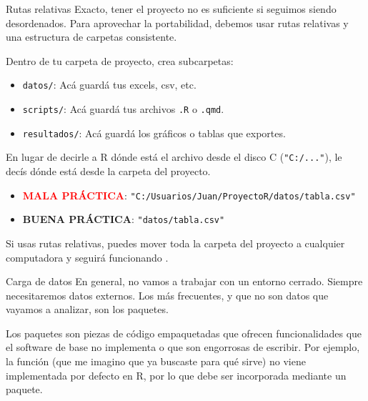 \documentclass[8pt]{beamer}
\begin{document}
	
	\begin{frame}[fragile]{Rutas relativas}
		Exacto, tener el proyecto no es suficiente si seguimos siendo desordenados. Para aprovechar la portabilidad, debemos usar rutas relativas y una estructura de carpetas consistente.
		
		Dentro de tu carpeta de proyecto, crea subcarpetas:
		\begin{itemize}
			\item \verb`datos/`: Ac\'a guard\'a tus excels, csv, etc. 
			\item \verb`scripts/`: Ac\'a guard\'a tus archivos \verb`.R` o \verb`.qmd`. 
			\item \verb`resultados/`: Ac\'a guard\'a los gráficos o tablas que exportes.
		\end{itemize}
		 
		
		En lugar de decirle a R dónde está el archivo desde el disco C (\verb`"C:/..."`), le dec\'is dónde está desde la carpeta del proyecto.
		\begin{itemize}
			\item \textcolor{red}{\textbf{MALA PRÁCTICA}}: \verb`"C:/Usuarios/Juan/ProyectoR/datos/tabla.csv"`
			\item \textcolor{green!60!black}{\textbf{BUENA PRÁCTICA}}: \verb`"datos/tabla.csv"`
		\end{itemize}		
		
		Si usas rutas relativas, puedes mover toda la carpeta del proyecto a cualquier computadora y seguirá funcionando .
	\end{frame}
	
	
	
	\begin{frame}[fragile]{Carga de datos}
		En general, no vamos a trabajar con un entorno cerrado. Siempre necesitaremos datos externos. Los m\'as frecuentes, y que no son datos que vayamos a analizar, son los paquetes.
		
		Los paquetes son piezas de c\'odigo empaquetadas que ofrecen funcionalidades  que el software de base no implementa o que son engorrosas de escribir. Por ejemplo, la funci\'on  (que me imagino que ya buscaste para qu\'e sirve) no viene implementada por defecto en R, por lo que debe ser incorporada mediante un paquete.
	\end{frame}
	
\end{document}
